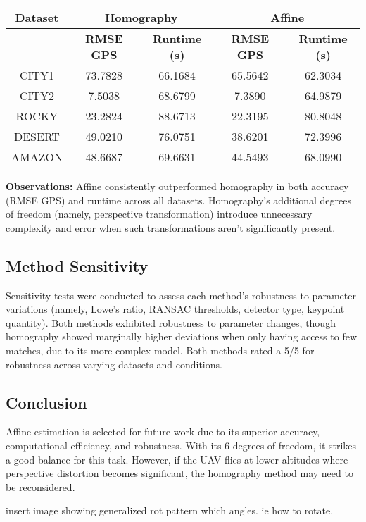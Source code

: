 \begin{table}[H]
    \centering
    \begin{tabular}{|c|c|c|c|c|}
    \hline
    \textbf{Dataset}   & \multicolumn{2}{c|}{\textbf{Homography}} & \multicolumn{2}{c|}{\textbf{Affine}} \\ \hline
    & \textbf{RMSE GPS} & \textbf{Runtime (s)} & \textbf{RMSE GPS} & \textbf{Runtime (s)} \\ \hline
    CITY1 & 73.7828                         & 66.1684           & 65.5642            & 62.3034           \\ \hline
    CITY2 & 7.5038                          & 68.6799           & 7.3890             & 64.9879           \\ \hline
    ROCKY & 23.2824                         & 88.6713           & 22.3195            & 80.8048           \\ \hline
    DESERT & 49.0210                        & 76.0751           & 38.6201            & 72.3996           \\ \hline
    AMAZON & 48.6687                        & 69.6631           & 44.5493            & 68.0990           \\ \hline
    \end{tabular}
\end{table}




\textbf{Observations:} Affine consistently outperformed homography in both accuracy (RMSE GPS) and runtime across all datasets. Homography's additional degrees of freedom (namely, perspective transformation) introduce unnecessary complexity and error when such transformations aren't significantly present.

\subsection{Method Sensitivity} Sensitivity tests were conducted to assess each method’s robustness to parameter variations (namely, Lowe's ratio, RANSAC thresholds, detector type, keypoint quantity). Both methods exhibited robustness to parameter changes, though homography showed marginally higher deviations when only having access to few matches, due to its more complex model. 
Both methods rated a 5/5 for robustness across varying datasets and conditions.

\subsection{Conclusion} Affine estimation is selected for future work due to its superior accuracy, computational efficiency, and robustness. With its 6 degrees of freedom, it strikes a good balance for this task. However, if the UAV flies at lower altitudes where perspective distortion becomes significant, the homography method may need to be reconsidered.






insert image showing generalized rot pattern which angles. ie how to rotate. 